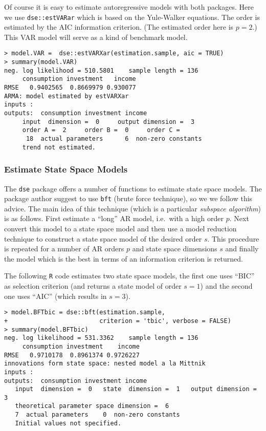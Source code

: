 \documentclass[]{article}
\begin{document}
Of course it is easy to estimate autoregressive models with both
packages. Here we use \texttt{dse::estVARar} which is based on the
Yule-Walker equations. The order is estimated by the AIC information
criterion. (The estimated order here is \(p=2\).) This VAR model will
serve as a kind of benchmark model.

\begin{verbatim}
> model.VAR =  dse::estVARXar(estimation.sample, aic = TRUE)
> summary(model.VAR)
neg. log likelihood = 510.5801    sample length = 136 
     consumption investment   income
RMSE   0.9402565  0.8669979 0.930077
ARMA: model estimated by estVARXar 
inputs :  
outputs:  consumption investment income 
     input  dimension =  0     output dimension =  3 
     order A =  2     order B =  0     order C =   
      18  actual parameters      6  non-zero constants
     trend not estimated.
\end{verbatim}

\subsubsection{Estimate State Space
Models}\label{estimate-state-space-models}

The \texttt{dse} package offers a number of functions to estimate state
space models. The package author suggest to use \texttt{bft} (brute
force technique), so we we follow this advice. The main idea of this
technique (which is a particular \emph{subspace algorithm}) is as
follows. First estimate a ``long'' AR model, i.e.~with a high order
\(p\). Next convert this model to a state space model and then use a
model reduction technique to construct a state space model of the
desired order \(s\). This procedure is repeated for a number of AR
orders \(p\) and state space dimensions \(s\) and finally the model
which is the best in terms of an information criterion is returned.

The following \texttt{R} code estimates two state space models, the
first one uses ``BIC'' as selection criterion (and returns a state model
of order \(s=1\)) and the second one uses ``AIC'' (which results in
\(s=3\)).

\begin{verbatim}
> model.BFTbic = dse::bft(estimation.sample, 
+                         criterion = 'tbic', verbose = FALSE)
> summary(model.BFTbic)
neg. log likelihood = 531.3362    sample length = 136 
     consumption investment    income
RMSE   0.9710178  0.8961374 0.9726227
innovations form state space: nested model a la Mittnik 
inputs :  
outputs:  consumption investment income 
   input  dimension =  0   state  dimension =  1   output dimension =  3 
   theoretical parameter space dimension =  6 
   7  actual parameters    0  non-zero constants
   Initial values not specified.
\end{verbatim}
\end{document}
